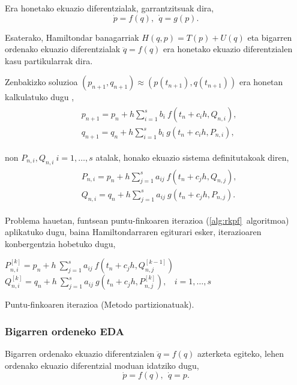 Era honetako ekuazio diferentzialak, garrantzitsuak dira,
\begin{equation*}
\dot{p}=f(q), \ \ \dot{q}=g(p).
\end{equation*}

Esaterako, Hamiltondar banagarriak $H(q,p)=T(p)+U(q)$ eta bigarren ordenako ekuazio diferentzialak $\ddot{q}=f(q)$ era honetako ekuazio diferentzialen kasu partikularrak dira.

Zenbakizko soluzioa $(p_{n+1},q_{n+1}) \approx (p(t_{n+1}),q(t_{n+1}))$ era honetan kalkulatuko dugu \cite{JMSanz-Serna1994},
\begin{align}
\begin{split}
&p_{n+1}=p_n+ h \sum\limits_{i=1}^{s} b_i \ f(t_n+c_ih,Q_{n,i}),\\
&q_{n+1}=q_n+ h \sum\limits_{i=1}^{s} b_i \ g(t_n+c_ih,P_{n,i}),
\end{split}
\end{align}

non $P_{n,i},Q_{n,i} \ i=1,\dots,s$ atalak, honako ekuazio sistema definitutakoak diren, 
\begin{align}
\begin{split}
&P_{n,i} =p_n+ h \sum\limits_{j=1}^{s} a_{ij} \ f(t_n+c_jh,Q_{n,j}), \\
&Q_{n,i} =q_n+ h \sum\limits_{j=1}^{s} a_{ij} \ g(t_n+c_jh,P_{n,j}).
\end{split}
\end{align}

Problema hauetan,  funtsean puntu-finkoaren iterazioa (\ref{alg:rkpf}~algoritmoa) aplikatuko dugu, baina Hamiltondarraren egiturari esker, iterazioaren konbergentzia hobetuko dugu,   

\begin{algorithm}[H]
  {
  \BlankLine
   $P_{n,i}^{[k]}=p_{n}+ h \ \sum\limits_{j=1}^{s} a_{ij} \ f(t_n+c_jh,Q_{n,j}^{[k-1]})$\; 
   $Q_{n,i}^{[k]}=q_{n}+ h \ \sum\limits_{j=1}^{s} a_{ij} \ g(t_n+c_jh,P_{n,j}^{[k]}), \ \ \ \ i=1,\dots,s $\; 
  }
 \caption{Puntu-finkoaren iterazioa (Metodo partizionatuak).}
 \label{alg:rkfppart}
\end{algorithm}


\subsubsection*{Bigarren ordeneko EDA}

Bigarren ordenako ekuazio diferentzialen $\ddot{q}=f(q)$ azterketa egiteko, lehen ordenako ekuazio diferentzial moduan idatziko dugu,
\begin{equation*}
\dot{p}=f(q), \ \ \dot{q}=p.
\end{equation*}

